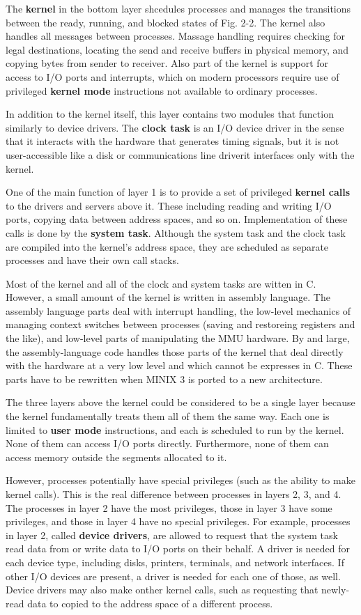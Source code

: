 \documentclass{book}
\newcommand {\kw}  [1] {\textbf{#1}}
\begin{document}
The \kw{kernel} in the bottom layer shcedules processes and manages the transitions between the ready, running, and blocked states of Fig. 2-2.
The kernel also handles all messages between processes.
Massage handling requires checking for legal destinations, locating the send and receive buffers in physical memory,
and copying bytes from sender to receiver.
Also part of the kernel is support for access to I/O ports and interrupts,
which on modern processors require use of privileged \kw{kernel mode} instructions not available to ordinary processes.

In addition to the kernel itself, this layer contains two modules that function similarly to device drivers.
The \kw{clock task} is an I/O device driver in the sense that it interacts with the hardware that generates timing signals,
but it is not user-accessible like a disk or communications line driverit interfaces only with the kernel.

One of the main function of layer 1 is to provide a set of privileged \kw{kernel calls} to the drivers and servers above it.
These including reading and writing I/O ports, copying data between address spaces, and so on.
Implementation of these calls is done by the \kw{system task}.
Although the system task and the clock task are compiled into the kernel's address space,
they are scheduled as separate processes and have their own call stacks.

Most of the kernel and all of the clock and system tasks are witten in C.
However, a small amount of the kernel is written in assembly language.
The assembly language parts deal with interrupt handling, the low-level mechanics of managing context switches between processes 
(saving and restoreing registers and the like), and low-level parts of manipulating the MMU hardware.
By and large, the assembly-language code handles those parts of the kernel 
that deal directly with the hardware at a very low level and which cannot be expresses in C.
These parts have to be rewritten when MINIX 3 is ported to a new architecture.

The three layers above the kernel could be considered to be a single layer because the kernel fundamentally treats them all of them the same way.
Each one is limited to \kw{user mode} instructions, and each is scheduled to run by the kernel.
None of them can access I/O ports directly.
Furthermore, none of them can access memory outside the segments allocated to it.

However, processes potentially have special privileges (such as the ability to make kernel calls).
This is the real difference between processes in layers 2, 3, and 4.
The processes in layer 2 have the most privileges, those in layer 3 have some privileges, and those in layer 4 have no special privileges.
For example, processes in layer 2, called \kw{device drivers}, are allowed to request that the system task 
read data from or write data to I/O ports on their behalf.
A driver is needed for each device type, including disks, printers, terminals, and network interfaces.
If other I/O devices are present, a driver is needed for each one of those, as well.
Device drivers may also make onther kernel calls, such as requesting that newly-read data to copied to the address space of a different process.
\end{document}
